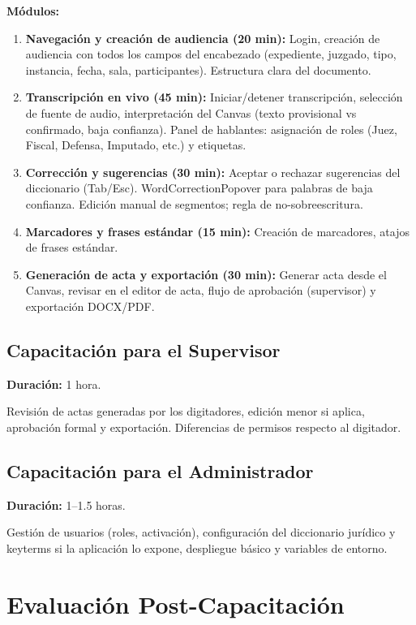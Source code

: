 \documentclass[12pt,a4paper]{report}
\begin{document}
\textbf{Módulos:}
\begin{enumerate}
    \item \textbf{Navegación y creación de audiencia (20 min):} Login, creación de audiencia con todos los campos del encabezado (expediente, juzgado, tipo, instancia, fecha, sala, participantes). Estructura clara del documento.
    \item \textbf{Transcripción en vivo (45 min):} Iniciar/detener transcripción, selección de fuente de audio, interpretación del Canvas (texto provisional vs confirmado, baja confianza). Panel de hablantes: asignación de roles (Juez, Fiscal, Defensa, Imputado, etc.) y etiquetas.
    \item \textbf{Corrección y sugerencias (30 min):} Aceptar o rechazar sugerencias del diccionario (Tab/Esc). WordCorrectionPopover para palabras de baja confianza. Edición manual de segmentos; regla de no-sobreescritura.
    \item \textbf{Marcadores y frases estándar (15 min):} Creación de marcadores, atajos de frases estándar.
    \item \textbf{Generación de acta y exportación (30 min):} Generar acta desde el Canvas, revisar en el editor de acta, flujo de aprobación (supervisor) y exportación DOCX/PDF.
\end{enumerate}

\subsection{Capacitación para el Supervisor}

\textbf{Duración:} 1 hora.

Revisión de actas generadas por los digitadores, edición menor si aplica, aprobación formal y exportación. Diferencias de permisos respecto al digitador.

\subsection{Capacitación para el Administrador}

\textbf{Duración:} 1--1.5 horas.

Gestión de usuarios (roles, activación), configuración del diccionario jurídico y keyterms si la aplicación lo expone, despliegue básico y variables de entorno.

\section{Evaluación Post-Capacitación}
\end{document}
